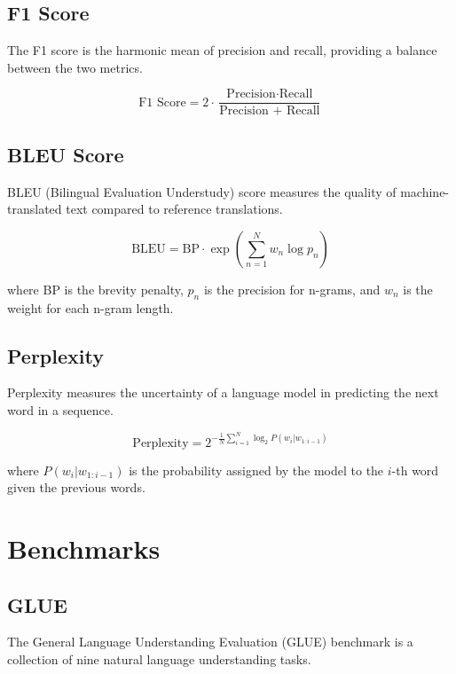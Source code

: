 \subsection{F1 Score}
The F1 score is the harmonic mean of precision and recall, providing a balance between the two metrics.

\begin{equation}
\text{F1 Score} = 2 \cdot \frac{\text{Precision} \cdot \text{Recall}}{\text{Precision + Recall}}
\end{equation}

\subsection{BLEU Score}
BLEU (Bilingual Evaluation Understudy) score measures the quality of machine-translated text compared to reference translations.

\begin{equation}
\text{BLEU} = \text{BP} \cdot \exp \left( \sum_{n=1}^N w_n \log p_n \right)
\end{equation}

where BP is the brevity penalty, \( p_n \) is the precision for n-grams, and \( w_n \) is the weight for each n-gram length.

\subsection{Perplexity}
Perplexity measures the uncertainty of a language model in predicting the next word in a sequence.

\begin{equation}
\text{Perplexity} = 2^{-\frac{1}{N} \sum_{i=1}^N \log_2 P(w_i | w_{1:i-1})}
\end{equation}

where \( P(w_i | w_{1:i-1}) \) is the probability assigned by the model to the \( i \)-th word given the previous words.

\section{Benchmarks}

\subsection{GLUE}
The General Language Understanding Evaluation (GLUE) benchmark is a collection of nine natural language understanding tasks.

